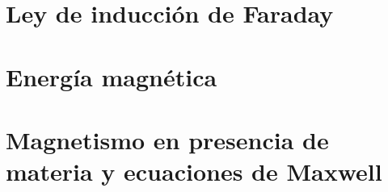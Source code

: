 \documentclass[11pt]{report}
\theoremstyle{plain}
\theoremstyle{definition}
\begin{document}

\chapter{Ley de inducción de Faraday}


\chapter{Energía magnética}


\chapter{Magnetismo en presencia de materia y ecuaciones de Maxwell}

\end{document}
